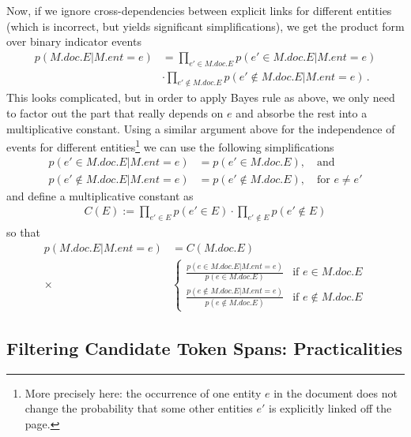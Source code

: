 \documentclass{article}
\begin{document}
Now, if we ignore cross-dependencies between explicit links for different entities (which is incorrect, but yields significant simplifications), we get the product form over binary indicator events
\begin{align}
p(M.doc.E | M.ent=e) & = \prod_{e' \in M.doc.E} p(e' \in M.doc.E | M.ent=e) 
\\ & \cdot \prod_{e' \not \in M.doc.E} p(e' \not\in M.doc.E | M.ent = e) \,. \nonumber
\end{align}
This looks complicated, but in order to apply Bayes rule as above, we only need to factor out the part that really depends on $e$ and absorbe the rest into a multiplicative constant. Using a similar argument above for the independence of events for different entities\footnote{More precisely here: the occurrence of one entity $e$ in the document does not change the probability that some other entities $e'$ is explicitly linked off the page.} we can use the following simplifications
\begin{align}
p(e' \in M.doc.E | M.ent=e) & = p(e' \in M.doc.E), \quad \text{and}\\
p(e' \not\in M.doc.E | M.ent=e) & = p(e' \not\in M.doc.E), \quad \text{for $e \neq e'$} \nonumber
\end{align}
and define a multiplicative constant as 
\begin{align}
C(E) := \prod_{e' \in E} p(e' \in E) \cdot \prod_{e' \not \in E} p(e' \not\in E)
\end{align}
so that 
\begin{align}
p(M.doc.E | M.ent=e) & = C(M.doc.E) \\
\times & \begin{cases}
\frac{p(e \in M.doc.E | M.ent=e)}{p(e \in M.doc.E)} & \text{if $e \in M.doc.E$} \\
\frac{p(e \not\in M.doc.E | M.ent=e)}{p(e \not\in M.doc.E)} & \text{if $e \not\in M.doc.E$} 
\end{cases} \nonumber
\end{align}

\subsection*{Filtering Candidate Token Spans: Practicalities} 
\end{document}
